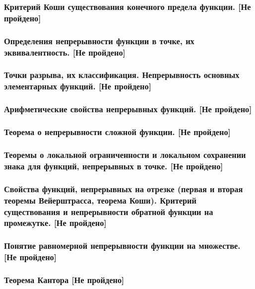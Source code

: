 \documentclass[12pt, a4paper]{article}
\begin{document}
	\subsubsection{Критерий Коши существования конечного предела функции. [Не пройдено]} 
	\subsubsection{Определения непрерывности функции в точке, их эквивалентность. [Не пройдено]}
	\subsubsection{Точки разрыва, их классификация. Непрерывность основных элементарных функций. [Не пройдено]} 
	\subsubsection{Арифметические свойства непрерывных функций. [Не пройдено]}
	\subsubsection{Теорема о непрерывности сложной функции. [Не пройдено]}
	\subsubsection{Теоремы о локальной ограниченности и локальном сохранении знака для функций, непрерывных в точке. [Не пройдено]} 
	\subsubsection{Свойства функций, непрерывных на отрезке (первая и вторая теоремы  Вейерштрасса, теорема Коши). Критерий существования и непрерывности обратной функции на промежутке. [Не пройдено]} 
	\subsubsection{Понятие равномерной непрерывности функции на множестве. [Не пройдено]} 
	\subsubsection{Теорема Кантора [Не пройдено]}
\end{document}
